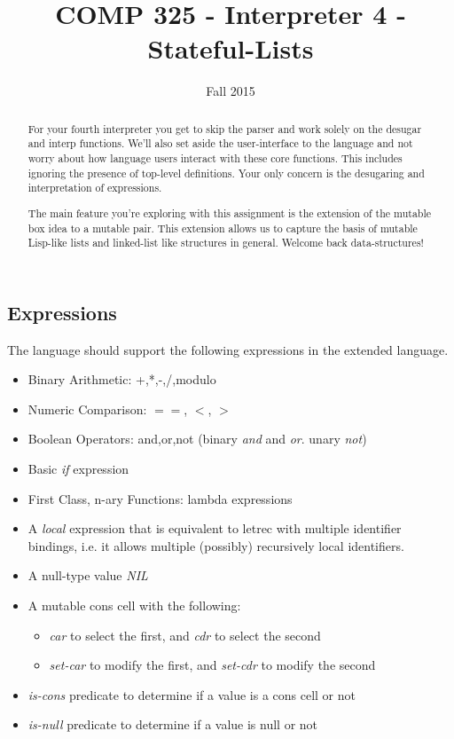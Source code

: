 \documentclass[10pt]{article}
\title{COMP 325 - Interpreter 4 - Stateful-Lists}
\author{  }
\date{Fall 2015}
\begin{document}
\maketitle

\begin{abstract}
For your fourth interpreter you get to skip the parser and work solely on the desugar and interp functions. We'll also set aside the user-interface to the language and not worry about how language users interact with these core functions. This includes ignoring the presence of top-level definitions. Your only concern is the desugaring and interpretation of expressions.

The main feature you're exploring with this assignment is the extension of the mutable box idea to a mutable pair. This extension allows us to capture the basis of mutable Lisp-like lists and linked-list like structures in general. Welcome back data-structures!
\end{abstract}

\subsection*{Expressions}

The language should support the following expressions in the extended language. 
\begin{itemize}
\item Binary Arithmetic: +,*,-,/,modulo
\item Numeric Comparison: $==$, $<$, $>$
\item Boolean Operators: and,or,not (binary \textit{and} and \textit{or}. unary \textit{not})
\item Basic \textit{if} expression
\item First Class, n-ary Functions: lambda expressions
\item A \textit{local} expression that is equivalent to letrec with multiple identifier bindings, i.e. it allows multiple (possibly) recursively local identifiers.
\item A null-type value \textit{NIL} 
\item A mutable cons cell with the following:
\begin{itemize}
\item \textit{car} to select the first, and \textit{cdr} to select the second
\item \textit{set-car} to modify the first, and \textit{set-cdr} to modify the second
\end{itemize}
\item \textit{is-cons} predicate to determine if a value is a cons cell or not
\item \textit{is-null} predicate to determine if a value is null or not
\end{itemize}
\end{document}

